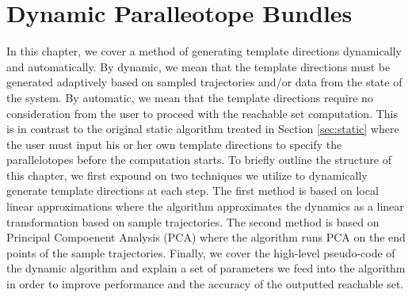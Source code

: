\chapter{Dynamic Paralleotope Bundles}

In this chapter, we cover a method of generating template directions dynamically and automatically.
%
By dynamic, we mean that the template directions must be generated adaptively based on sampled trajectories and/or data from the state of the system.
%
By automatic, we mean that the template directions require no consideration from the user to proceed with the reachable set computation. This is in contrast to the original static algorithm treated in Section \ref{sec:static} where the user must input his or her own template directions to specify the parallelotopes before the computation starts.
%
To briefly outline the structure of this chapter, we first expound on two techniques we utilize to dynamically generate template directions at each step.
%
The first method is based on local linear approximations where the algorithm approximates the dynamics as a linear transformation based on sample trajectories.
%
The second method is based on Principal Compoenent Analysis (PCA) where the algorithm runs PCA on the end points of the sample trajectories.
%
Finally, we cover the high-level pseudo-code of the dynamic algorithm and explain a set of parameters we feed into the algorithm in order to improve performance and the accuracy of the outputted reachable set.



